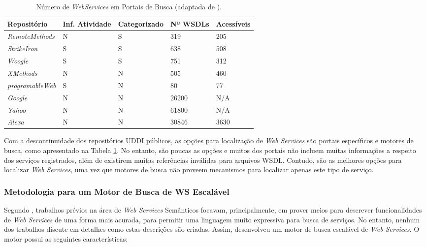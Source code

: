\begin{table}[ht!]
  \begin{center}
  \setlength{\belowcaptionskip}{10pt} %
  \footnotesize {
    \begin{tabular}{|p{3cm}|p{2.5cm}|p{2cm}|p{1.8cm}|p{1.5cm}|}
	  \hline
	  \textbf{Repositório} & \textbf{Inf. Atividade} & \textbf{Categorizado} & \textbf{Nº WSDLs} & \textbf{Acessíveis} \\
	  \hline
	  \textit{RemoteMethods} & N & S & 319 & 205\\
	  \hline
	  \textit{StrikeIron} & S & S & 638 & 508\\
	  \hline
	  \textit{Woogle} & S & S & 751 & 312\\
	  \hline
	  \textit{XMethods} & N & N & 505 & 460\\
	  \hline
	  \textit{programableWeb} & S & N & 80 & 77\\
	  \hline
	  \textit{Google} & N & N & 26200 & N/A\\
	  \hline
	  \textit{Yahoo} & N & N & 61800 & N/A\\
	  \hline
	  \textit{Alexa} & N & N & 30846 & 3630\\
	  \hline
    \end{tabular}
  }
  \caption{Número de \textit{WebServices} em Portais de Busca (adaptada de \cite{lausen2007finding}).}
  \label{tab:ws-find-portals}
  \end{center}
\end{table}

Com a descontinuidade dos repositórios UDDI públicos, as opções para localização de \textit{Web Services} são portais específicos e motores de busca, como apresentado na Tabela \ref{tab:ws-find-portals}. No entanto, são poucas as opções e muitos dos portais não incluem muitas informações a respeito dos serviços registrados, além de existirem muitas referências inválidas para arquivos WSDL. Contudo, são as melhores opções para localizar \textit{Web Services}, uma vez que motores de busca não proveem mecanismos para localizar apenas este tipo de serviço.

\subsubsection{Metodologia para um Motor de Busca de WS Escalável}

Segundo \cite{lausen2007finding}, trabalhos prévios na área de \textit{Web Services} Semânticos focavam, principalmente, em prover meios para descrever funcionalidades de \textit{Web Services} de uma forma mais acurada, para permitir uma linguagem muito expressiva para busca de serviços. No entanto, nenhum dos trabalhos discute em detalhes como estas descrições são criadas. Assim, \cite{lausen2007finding} desenvolveu um motor de busca escalável de \textit{Web Services}. O motor possui as seguintes características:

